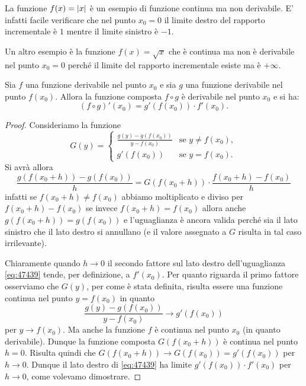 \begin{example}
\mymark{***}
La funzione $f(x) = {\left|x\right|}$ è un esempio di funzione continua ma non
derivabile. E' infatti facile verificare che nel punto $x_0=0$ il
limite destro del rapporto incrementale è $1$ mentre il limite
sinistro è $-1$.

Un altro esempio è la funzione $f(x) = \sqrt{x}$ che è continua ma non
è derivabile nel punto $x_0=0$ perché il limite del rapporto incrementale esiste ma è $+\infty$.
\end{example}



\begin{theorem}
\mymark{**}
Sia $f$ una funzione derivabile nel punto $x_0$
e sia $g$ una funzione derivabile nel punto $f(x_0)$.
Allora la funzione composta $f\circ g$ è derivabile
nel punto $x_0$ e si ha:
\[
  (f\circ g)'(x_0) = g'(f(x_0))\cdot f'(x_0).
\]
\end{theorem}
%
\begin{proof}
\mymark{**}
Consideriamo la funzione
\[
  G(y) =
  \begin{cases}
   \frac{g(y) - g(f(x_0))}{y-f(x_0)} & \text{se $y \neq f(x_0)$},\\
   g'(f(x_0)) & \text{se $y=f(x_0)$}.
  \end{cases}
\]
Si avrà allora
\begin{equation}\label{eq:47439}
 \frac{g(f(x_0+h))-g(f(x_0))}{h}
 = G(f(x_0+h)) \cdot \frac{f(x_0+h)-f(x_0)}{h}
\end{equation}
infatti se $f(x_0+h)\neq f(x_0)$ abbiamo moltiplicato e diviso
per $f(x_0+h) - f(x_0)$ se invece $f(x_0+h)=f(x_0)$ allora anche $g(f(x_0+h))=g(f(x_0))$ e l'uguaglianza è ancora valida perché sia il lato sinistro che il lato destro si annullano (e il valore assegnato a $G$ risulta in tal caso irrilevante).

Chiaramente quando $h\to 0$ il secondo fattore sul lato destro
dell'uguaglianza \eqref{eq:47439}
tende, per definizione, a $f'(x_0)$.
Per quanto riguarda il primo fattore
osserviamo che $G(y)$, per come è stata definita, risulta essere una funzione continua nel punto $y=f(x_0)$ in quanto
\[
\frac{g(y) - g(f(x_0))}{y-f(x_0)} \to g'(f(x_0))
\]
per $y\to f(x_0)$.
Ma anche la funzione $f$ è continua nel punto $x_0$ (in quanto derivabile).
Dunque la funzione composta $G(f(x_0+h))$ è continua nel punto $h=0$.
Risulta quindi che $G(f(x_0+h)) \to G(f(x_0)) = g'(f(x_0))$ per $h\to 0$.
Dunque il lato destro di \eqref{eq:47439} ha limite $g'(f(x_0)) \cdot f'(x_0)$ per $h\to 0$, come volevamo dimostrare.
\end{proof}

